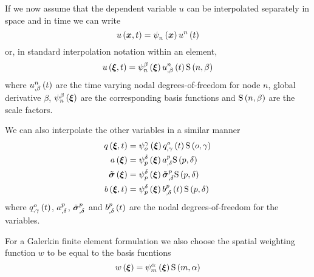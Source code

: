 If we now assume that the dependent variable $u$ can be interpolated
separately in space and in time we can write
\begin{equation}
  \fnof{u}{\vect{x},t}=\gbfn{n}{}{\vect{x}}\fnof{\nodept{u}{n}}{t}
\end{equation}
or, in standard interpolation notation within an element,
\begin{equation}
  \fnof{u}{\vect{\xi},t}=\gbfn{n}{\beta}{\vect{\xi}}
  \fnof{\nodedof{u}{n}{\beta}}{t}\gsf{n}{\beta}
\end{equation}
where $   {u}^{n} _{,\beta} \left( t \right) $ are the time varying nodal
degrees-of-freedom for node $n$, global derivative $\beta$,
$\gbfn{n}{\beta}{\vect{\xi}}$ are the corresponding basis functions 
and $   \mathrm{S} \left( n,\beta \right)  $ are the scale factors. 

We can also interpolate the other variables in a similar manner \ie
\begin{equation}
  \begin{split}
    \fnof{q}{\vect{\xi},t} &= \gbfn{o}{\gamma}{\vect{\xi}}
    \fnof{\nodedof{q}{o}{\gamma}}{t}\gsf{o}{\gamma} \\
    \fnof{a}{\vect{\xi}} &=\gbfn{p}{\delta}{\vect{\xi}}
    \nodedof{a}{p}{\delta}\gsf{p}{\delta} \\
    \fnof{\tilde{\tensor{\sigma}}}{\vect{\xi}}
    &=\gbfn{p}{\delta}{\vect{\xi}}\nodedof{\tilde{\tensor{\sigma}}}{p}{\delta}
    \gsf{p}{\delta} \\
    \fnof{b}{\vect{\xi},t} &=
    \gbfn{p}{\delta}{\vect{\xi}}\fnof{\nodedof{b}{p}{\delta}}{t}\gsf{p}{\delta}
  \end{split}
\end{equation}
where $   {q}^{o} _{,\gamma} \left( t \right) $, $  {a}^{p} _{,\delta} $,
$  {\tilde{\boldsymbol{\sigma}}}^{p} _{,\delta} $ and 
$   {b}^{p} _{,\delta} \left( t \right) $ are the
nodal degrees-of-freedom for the variables.

For a Galerkin finite element formulation we also choose the spatial weighting
function $w$ to be equal to the basis fucntions \ie
\begin{equation}
  \fnof{w}{\vect{\xi}}=\gbfn{m}{\alpha}{\vect{\xi}}\gsf{m}{\alpha}
\end{equation}


